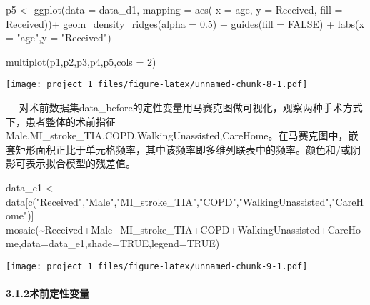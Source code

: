 \documentclass[
]{article}
\newenvironment{Shaded}{\begin{snugshade}}{\end{snugshade}}
\newcommand{\AttributeTok}[1]{\textcolor[rgb]{0.77,0.63,0.00}{#1}}
\newcommand{\ConstantTok}[1]{\textcolor[rgb]{0.00,0.00,0.00}{#1}}
\newcommand{\DecValTok}[1]{\textcolor[rgb]{0.00,0.00,0.81}{#1}}
\newcommand{\FloatTok}[1]{\textcolor[rgb]{0.00,0.00,0.81}{#1}}
\newcommand{\FunctionTok}[1]{\textcolor[rgb]{0.00,0.00,0.00}{#1}}
\newcommand{\NormalTok}[1]{#1}
\newcommand{\OtherTok}[1]{\textcolor[rgb]{0.56,0.35,0.01}{#1}}
\newcommand{\SpecialCharTok}[1]{\textcolor[rgb]{0.00,0.00,0.00}{#1}}
\newcommand{\StringTok}[1]{\textcolor[rgb]{0.31,0.60,0.02}{#1}}
\begin{document}
\begin{Shaded}
\begin{Highlighting}[]
\NormalTok{p5 }\OtherTok{\textless{}{-}} \FunctionTok{ggplot}\NormalTok{(}\AttributeTok{data =}\NormalTok{ data\_d1, }\AttributeTok{mapping =} \FunctionTok{aes}\NormalTok{(}
   \AttributeTok{x =}\NormalTok{ age, }
   \AttributeTok{y =}\NormalTok{ Received,}
   \AttributeTok{fill =}\NormalTok{ Received))}\SpecialCharTok{+} \FunctionTok{geom\_density\_ridges}\NormalTok{(}\AttributeTok{alpha =} \FloatTok{0.5}\NormalTok{) }\SpecialCharTok{+} \FunctionTok{guides}\NormalTok{(}\AttributeTok{fill =} \ConstantTok{FALSE}\NormalTok{) }\SpecialCharTok{+} \FunctionTok{labs}\NormalTok{(}\AttributeTok{x =} \StringTok{"age"}\NormalTok{,}\AttributeTok{y =} \StringTok{"Received"}\NormalTok{)}

\FunctionTok{multiplot}\NormalTok{(p1,p2,p3,p4,p5,}\AttributeTok{cols =} \DecValTok{2}\NormalTok{)}
\end{Highlighting}
\end{Shaded}

\texttt{[image: project\_1\_files/figure-latex/unnamed-chunk-8-1.pdf]}

 
对术前数据集data\_before的定性变量用马赛克图做可视化，观察两种手术方式下，患者整体的术前指征Male,MI\_stroke\_TIA,COPD,WalkingUnassisted,CareHome。在马赛克图中，嵌套矩形面积正比于单元格频率，其中该频率即多维列联表中的频率。颜色和/或阴影可表示拟合模型的残差值。

\begin{Shaded}
\begin{Highlighting}[]
\NormalTok{data\_e1 }\OtherTok{\textless{}{-}}\NormalTok{ data[}\FunctionTok{c}\NormalTok{(}\StringTok{"Received"}\NormalTok{,}\StringTok{"Male"}\NormalTok{,}\StringTok{"MI\_stroke\_TIA"}\NormalTok{,}\StringTok{"COPD"}\NormalTok{,}\StringTok{"WalkingUnassisted"}\NormalTok{,}\StringTok{"CareHome"}\NormalTok{)]}
\FunctionTok{mosaic}\NormalTok{(}\SpecialCharTok{\textasciitilde{}}\NormalTok{Received}\SpecialCharTok{+}\NormalTok{Male}\SpecialCharTok{+}\NormalTok{MI\_stroke\_TIA}\SpecialCharTok{+}\NormalTok{COPD}\SpecialCharTok{+}\NormalTok{WalkingUnassisted}\SpecialCharTok{+}\NormalTok{CareHome,}\AttributeTok{data=}\NormalTok{data\_e1,}\AttributeTok{shade=}\ConstantTok{TRUE}\NormalTok{,}\AttributeTok{legend=}\ConstantTok{TRUE}\NormalTok{)}
\end{Highlighting}
\end{Shaded}

\texttt{[image: project\_1\_files/figure-latex/unnamed-chunk-9-1.pdf]}

\hypertarget{ux672fux524dux5b9aux6027ux53d8ux91cf}{%
\paragraph{3.1.2术前定性变量}\label{ux672fux524dux5b9aux6027ux53d8ux91cf}}
\end{document}
